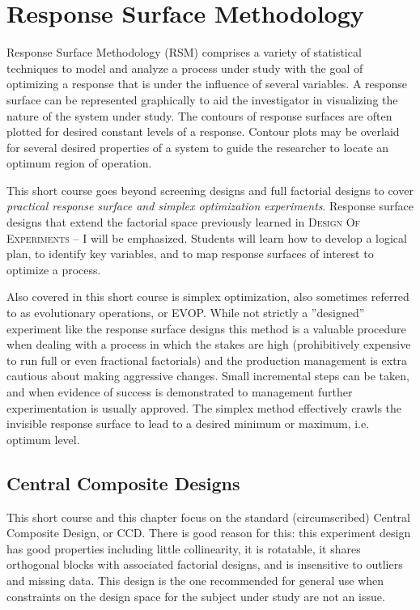 
\chapter{Response Surface Methodology}
Response Surface Methodology (RSM) comprises a variety of statistical techniques to model and analyze a process under study with the goal of optimizing a response that is under the influence of several variables. A response surface can be represented graphically to aid the investigator in visualizing the nature of the system under study. The contours of response surfaces are often plotted for desired constant levels of a response.  Contour plots may be overlaid for several desired properties of a system to guide the researcher to locate an optimum region of operation.

This short course goes beyond screening designs and full factorial designs to cover \textit{practical response surface and simplex optimization experiments}.  Response surface designs that extend the factorial space previously learned in  \textsc{Design Of Experiments -- I} will be emphasized.  Students will learn how to develop a logical plan, to identify key variables, and to map response surfaces of interest to optimize a process.

Also covered in this short course is simplex optimization, also sometimes referred to as evolutionary operations, or EVOP.  While not strictly a ''designed'' experiment like the response surface designs this method is a valuable procedure when dealing with a process in which the stakes are high (prohibitively expensive to run full or even fractional factorials) and the production management is extra cautious about making aggressive changes.  Small incremental steps can be taken, and when evidence of success is demonstrated to management further experimentation is usually approved. The simplex method effectively crawls the invisible response surface to lead to a desired minimum or maximum, i.e. optimum level.

\section{Central Composite Designs}

This short course and this chapter focus on the standard (circumscribed) Central Composite Design, or CCD.  There is good reason for this: this experiment design has good properties including little collinearity, it is rotatable, it shares orthogonal blocks with associated factorial designs, and is insensitive to outliers and missing data. This design is the one recommended for general use when constraints on the design space for the subject under study are not an issue.

